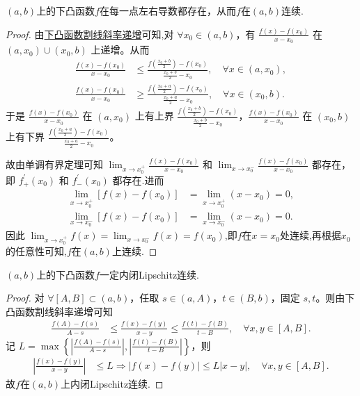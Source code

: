 \documentclass[../../main.tex]{subfiles}
\begin{document}
\begin{theorem}[开区间下凸函数左右导数处处存在]\label{theorem:开区间下凸函数左右导数处处存在}
\((a,b)\)上的下凸函数\(f\)在每一点左右导数都存在，从而\(f\)在\((a,b)\)连续.
\end{theorem}
\begin{proof}
由\hyperref[下凸函数割线斜率递增]{下凸函数割线斜率递增}可知,对 $\forall x_0\in (a,b)$，有 $\frac{f(x) - f(x_0)}{x - x_0}$ 在 $(a,x_0) \cup (x_0,b)$ 上递增。从而
\begin{align*}
\frac{f(x) - f(x_0)}{x - x_0} &\leqslant \frac{f\left(\frac{x_0 + b}{2}\right) - f(x_0)}{\frac{x_0 + b}{2} - x_0}, \quad \forall x\in (a,x_0), \\
\frac{f(x) - f(x_0)}{x - x_0} &\geqslant \frac{f\left(\frac{x_0 + a}{2}\right) - f(x_0)}{\frac{x_0 + a}{2} - x_0}, \quad \forall x\in (x_0,b).
\end{align*}
于是 $\frac{f(x) - f(x_0)}{x - x_0}$ 在 $(a,x_0)$ 上有上界 $\frac{f\left(\frac{x_0 + b}{2}\right) - f(x_0)}{\frac{x_0 + b}{2} - x_0}$，$\frac{f(x) - f(x_0)}{x - x_0}$ 在 $(x_0,b)$ 上有下界 $\frac{f\left(\frac{x_0 + a}{2}\right) - f(x_0)}{\frac{x_0 + a}{2} - x_0}$。

故由单调有界定理可知 $\lim_{x \to x_0^+} \frac{f(x) - f(x_0)}{x - x_0}$ 和 $\lim_{x \to x_0^-} \frac{f(x) - f(x_0)}{x - x_0}$ 都存在，即 $f_{+}^{\prime}(x_0)$ 和 $f_{-}^{\prime}(x_0)$ 都存在.进而
\begin{align*}
\lim_{x \to x_0^+} [f(x) - f(x_0)] &= \lim_{x \to x_0^+} (x - x_0) = 0, \\
\lim_{x \to x_0^-} [f(x) - f(x_0)] &= \lim_{x \to x_0^-} (x - x_0) = 0.
\end{align*}
因此 $\lim_{x \to x_0^+} f(x) = \lim_{x \to x_0^-} f(x) = f(x_0)$,即$f$在$x=x_0$处连续,再根据$x_0$的任意性可知,$f$在$(a,b)$上连续.
\end{proof}


\begin{theorem}[开区间上的下凸函数内闭Lipschitz连续]\label{theorem:开区间上的下凸函数一定内闭Lipschitz连续}
\((a,b)\)上的下凸函数\(f\)一定内闭Lipschitz连续.
\end{theorem}
\begin{proof}
对 $\forall [A,B] \subset (a,b)$，任取 $s\in (a,A)$，$t\in (B,b)$，固定 $s,t$。则由下凸函数割线斜率递增可知
\begin{align*}
\frac{f(A) - f(s)}{A - s} &\leqslant \frac{f(x) - f(y)}{x - y} \leqslant \frac{f(t) - f(B)}{t - B}, \quad \forall x,y\in [A,B].
\end{align*}
记 $L = \max\left\{\left|\frac{f(A) - f(s)}{A - s}\right|, \left|\frac{f(t) - f(B)}{t - B}\right|\right\}$，则
\begin{align*}
\left|\frac{f(x) - f(y)}{x - y}\right| &\leqslant L \Rightarrow \left|f(x) - f(y)\right| \leqslant L\left|x - y\right|, \quad \forall x,y\in [A,B].
\end{align*}
故\(f\)在$(a,b)$上内闭Lipschitz连续.
\end{proof}
\end{document}
